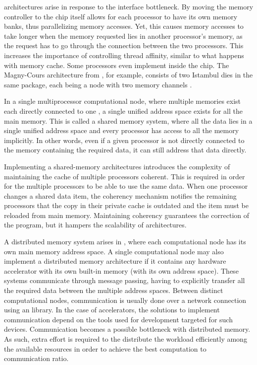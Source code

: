 \documentclass[../thesis]{subfiles}
\begin{document}
		\numa architectures arise in response to the interface bottleneck. By moving the memory controller to the \cpu chip itself allows for each processor to have its own memory banks, thus parallelizing memory accesses. Yet, this causes memory accesses to take longer when the memory requested lies in another processor's memory, as the request has to go through the connection between the two processors. This increases the importance of controlling thread affinity, similar to what happens with memory cache. Some processors even implement \numa inside the chip. The Magny-Cours architecture from \amd, for example, consists of two Istambul dies in the same package, each being a \numa node with two memory channels \cite{AMD:MagnyCours}.

		In a single multiprocessor computational node, where multiple memories exist each directly connected to one \cpu, a single unified address space exists for all the main memory. This is called a shared memory system, where all the data lies in a single unified address space and every processor has access to all the memory implicitly. In other words, even if a given processor is not directly connected to the memory containing the required data, it can still address that data directly.

		Implementing a shared-memory \numa architectures introduces the complexity of maintaining the cache of multiple processors coherent. This is required in order for the multiple processors to be able to use the same data. When one processor changes a shared data item, the coherency mechanism notifies the remaining processors that the copy in their private cache is outdated and the item must be reloaded from main memory. Maintaining coherency guarantees the correction of the program, but it hampers the scalability of \numa architectures.

		A distributed memory system arises in \hetplats, where each computational node has its own main memory address space. A single computational node may also implement a distributed memory architecture if it contains any hardware accelerator with its own built-in memory (with its own address space). These systems communicate through message passing, having to explicitly transfer all the required data between the multiple address spaces. Between distinct computational nodes, communication is usually done over a network connection using an \mpi library. In the case of accelerators, the solutions to implement communication depend on the tools used for development targeted for such devices. Communication becomes a possible bottleneck with distributed memory. As such, extra effort is required to the distribute the workload efficiently among the available resources in order to achieve the best computation to communication ratio.

		
	
\end{document}
